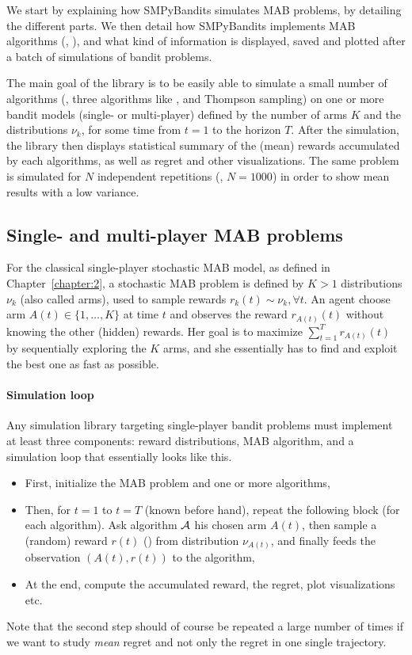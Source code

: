 
We start by explaining how SMPyBandits simulates MAB problems, by detailing the different parts.
We then detail how SMPyBandits implements MAB algorithms (\eg, \UCB),
and what kind of information is displayed, saved and plotted after a batch of simulations of bandit problems.

The main goal of the library is to be easily able to simulate a small number of algorithms (\eg, three algorithms like \UCB, \klUCB{} and Thompson sampling) on one or more bandit models (single- or multi-player) defined by the number of arms $K$ and the distributions $\nu_k$, for some time from $t=1$ to the horizon $T$.
After the simulation, the library then displays statistical summary of the (mean) rewards accumulated by each algorithms, as well as regret and other visualizations.
The same problem is simulated for $N$ independent repetitions (\eg, $N=1000$) in order to show mean results with a low variance.


\subsection{Single- and multi-player MAB problems}

For the classical single-player stochastic MAB model, as defined in Chapter~\ref{chapter:2},
a stochastic MAB problem is defined by $K>1$ distributions $\nu_k$ (also called arms),
used to sample \iid{} rewards $r_k(t) \sim \nu_k, \forall t$.
An agent choose arm $A(t)\in\{1,\dots,K\}$ at time $t$ and observes the reward $r_{A(t)}(t)$ without knowing the other (hidden) rewards.
Her goal is to maximize $\sum_{t=1}^T r_{A(t)}(t)$ by sequentially exploring the $K$ arms, and she essentially has to find and exploit the best one as fast as possible.

\paragraph{Simulation loop}
%
Any simulation library targeting single-player bandit problems must implement at least three components:
reward distributions, MAB algorithm, and a simulation loop that essentially looks like this.
\begin{itemize}
    \item First, initialize the MAB problem and one or more algorithms,
    \item Then, for $t=1$ to $t=T$ (known before hand), repeat the following block (for each algorithm). Ask algorithm $\mathcal{A}$ his chosen arm $A(t)$, then sample a (random) reward $r(t)$ (\iid) from distribution $\nu_{A(t)}$, and finally feeds the observation $(A(t), r(t))$ to the algorithm,
    \item At the end, compute the accumulated reward, the regret, plot visualizations etc.
\end{itemize}
%
Note that the second step should of course be repeated a large number of times if we want to study \emph{mean} regret and not only the regret in one single trajectory.

